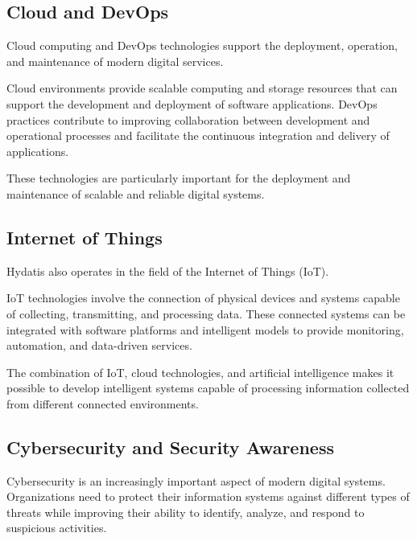 \documentclass[12pt,a4paper]{report}
\begin{document}
\subsection{Cloud and DevOps}

Cloud computing and DevOps technologies support the deployment, operation, and maintenance of modern digital services.

Cloud environments provide scalable computing and storage resources that can support the development and deployment of software applications. DevOps practices contribute to improving collaboration between development and operational processes and facilitate the continuous integration and delivery of applications.

These technologies are particularly important for the deployment and maintenance of scalable and reliable digital systems.

\subsection{Internet of Things}

Hydatis also operates in the field of the Internet of Things (IoT).

IoT technologies involve the connection of physical devices and systems capable of collecting, transmitting, and processing data. These connected systems can be integrated with software platforms and intelligent models to provide monitoring, automation, and data-driven services.

The combination of IoT, cloud technologies, and artificial intelligence makes it possible to develop intelligent systems capable of processing information collected from different connected environments.

\subsection{Cybersecurity and Security Awareness}

Cybersecurity is an increasingly important aspect of modern digital systems. Organizations need to protect their information systems against different types of threats while improving their ability to identify, analyze, and respond to suspicious activities.
\end{document}
